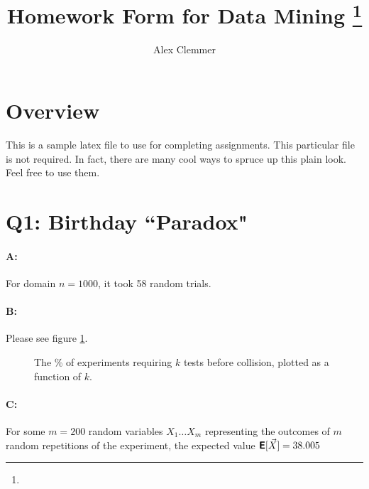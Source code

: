 \documentclass[11pt]{article}
\title{Homework Form for Data Mining
\footnote{\s{CS 6955 Data Mining; \;\; Spring 2012 \hfill
Instructor: Jeff M. Phillips, University of Utah}
}
}
\author{Alex Clemmer}
\newcommand{\E}{\textbf{\textsf{E}}}
\begin{document}
\maketitle





\section*{Overview}

This is a sample latex file to use for completing assignments.  This particular file is not required.  In fact, there are many cool ways to spruce up this plain look.  Feel free to use them.  

\section*{Q1: Birthday ``Paradox"}

\paragraph*{A:} For domain $n = 1000$, it took 58 random trials.

\paragraph*{B:} Please see figure \ref{fig:cdp1}.

\begin{figure}[h]
\caption{The \% of experiments requiring $k$ tests before collision, plotted as a function of $k$.}
\label{fig:cdp1}
\end{figure}

\paragraph*{C:} For some $m = 200$ random variables $X_1 \ldots X_m$ representing the outcomes of $m$ random repetitions of the experiment, the expected value $\E[\vec{X}] = 38.005$
\end{document}

